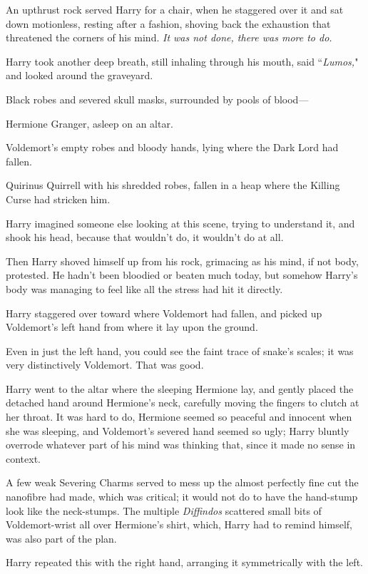 An upthrust rock served Harry for a chair, when he staggered over it and sat down motionless, resting after a fashion, shoving back the exhaustion that threatened the corners of his mind. \emph{It was not done, there was more to do.}

Harry took another deep breath, still inhaling through his mouth, said ``\emph{Lumos,}" and looked around the graveyard.

Black robes and severed skull masks, surrounded by pools of blood—

Hermione Granger, asleep on an altar.

Voldemort's empty robes and bloody hands, lying where the Dark Lord had fallen.

Quirinus Quirrell with his shredded robes, fallen in a heap where the Killing Curse had stricken him.

Harry imagined someone else looking at this scene, trying to understand it, and shook his head, because that wouldn't do, it wouldn't do at all.

Then Harry shoved himself up from his rock, grimacing as his mind, if not body, protested. He hadn't been bloodied or beaten much today, but somehow Harry's body was managing to feel like all the stress had hit it directly.

Harry staggered over toward where Voldemort had fallen, and picked up Voldemort's left hand from where it lay upon the ground.

Even in just the left hand, you could see the faint trace of snake's scales; it was very distinctively Voldemort. That was good.

Harry went to the altar where the sleeping Hermione lay, and gently placed the detached hand around Hermione's neck, carefully moving the fingers to clutch at her throat. It was hard to do, Hermione seemed so peaceful and innocent when she was sleeping, and Voldemort's severed hand seemed so ugly; Harry bluntly overrode whatever part of his mind was thinking that, since it made no sense in context.

A few weak Severing Charms served to mess up the almost perfectly fine cut the nanofibre had made, which was critical; it would not do to have the hand-stump look like the neck-stumps. The multiple \emph{Diffindos} scattered small bits of Voldemort-wrist all over Hermione's shirt, which, Harry had to remind himself, was also part of the plan.

Harry repeated this with the right hand, arranging it symmetrically with the left.

